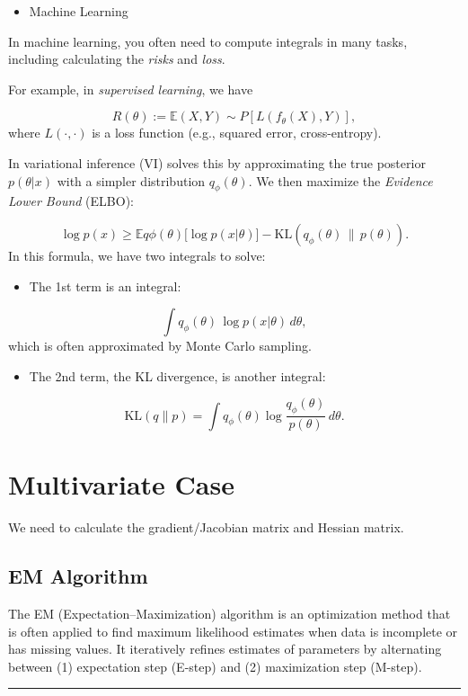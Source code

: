 \documentclass[
  letterpaper,
  DIV=11,
  numbers=noendperiod]{scrreprt}
\providecommand{\tightlist}{%
  \setlength{\itemsep}{0pt}\setlength{\parskip}{0pt}}
\begin{document}
\begin{itemize}
\tightlist
\item
  Machine Learning
\end{itemize}

In machine learning, you often need to compute integrals in many tasks,
including calculating the \emph{risks} and \emph{loss}.

For example, in \emph{supervised learning}, we have

\[R(\theta) := \mathbb E{(X,Y) \sim P}[L(f_\theta(X), Y)],
\] where \(L(\cdot,\cdot)\) is a loss function (e.g., squared error,
cross-entropy).

In variational inference (VI) solves this by approximating the true
posterior \(p(\theta|x)\) with a simpler distribution
\(q_\phi(\theta)\). We then maximize the \emph{Evidence Lower Bound}
(ELBO):

\[
\log p(x) \geq \mathbb{E}{q\phi(\theta)}\big[\log p(x|\theta)\big] - \text{KL}(q_\phi(\theta)\,\|\,p(\theta)).
\] In this formula, we have two integrals to solve:

\begin{itemize}
\tightlist
\item
  The 1st term is an integral:
\end{itemize}

\[\int q_\phi(\theta)\,\log p(x|\theta)\, d\theta,\] which is often
approximated by Monte Carlo sampling.

\begin{itemize}
\tightlist
\item
  The 2nd term, the KL divergence, is another integral:
\end{itemize}

\[\text{KL}(q \| p) = \int q_\phi(\theta) \log \frac{q_\phi(\theta)}{p(\theta)} \, d\theta.\]

\section{}\label{section}

\section{Multivariate Case}\label{multivariate-case}

We need to calculate the gradient/Jacobian matrix and Hessian matrix.

\subsection{EM Algorithm}\label{em-algorithm}

The EM (Expectation--Maximization) algorithm is an optimization method
that is often applied to find maximum likelihood estimates when data is
incomplete or has missing values. It iteratively refines estimates of
parameters by alternating between (1) expectation step (E-step) and (2)
maximization step (M-step).

\begin{center}\rule{0.5\linewidth}{0.5pt}\end{center}
\end{document}
